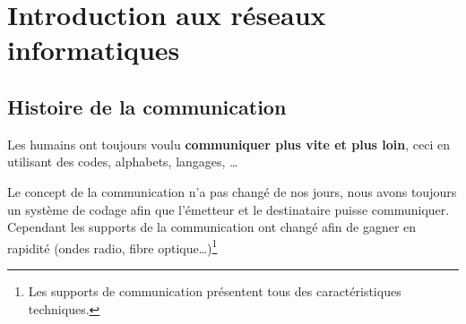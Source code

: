\documentclass[12pt,a4paper,openany]{book}
\begin{document}
	\setcounter{tocdepth}{2}
	\setcounter{secnumdepth}{3}
	\maketitle
	\tableofcontents
	\part{Introduction aux réseaux informatiques}
	\chapter{Histoire de la communication}
		Les humains ont toujours voulu \textbf{communiquer plus vite et plus loin}, ceci en utilisant des codes, alphabets, langages, \ldots
		

			Le concept de la communication n'a pas changé de nos jours, nous avons toujours un système de codage afin que l'émetteur et le destinataire puisse communiquer. Cependant les supports de la communication ont changé afin de gagner en rapidité (ondes radio, fibre optique\ldots)\footnote{Les supports de communication présentent tous des caractéristiques techniques.}
\end{document}

